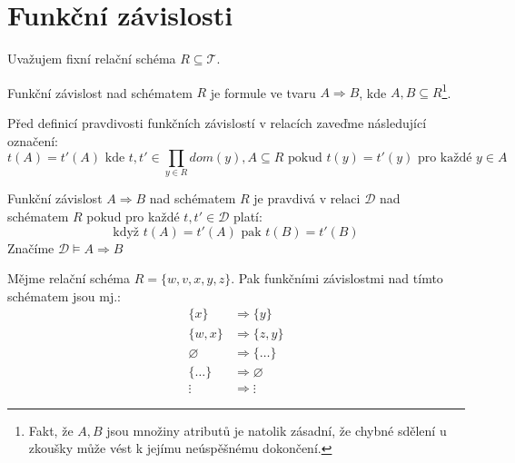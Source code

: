 \section{Funkční závislosti}
Uvažujem fixní relační schéma $R \subseteq \mathcal{T}$.
\begin{uptheorem}
Funkční závislost nad schématem $R$ je formule ve tvaru $A \Rightarrow B$, kde $A, B \subseteq R$\footnote{Fakt, že $A, B$ jsou množiny atributů je natolik zásadní, že chybné sdělení u zkoušky může vést k jejímu neúspěšnému dokončení.}.
\end{uptheorem}
Před definicí pravdivosti funkčních závislostí v relacích zaveďme následující označení:
$$
t(A)=t'(A) \text{ kde } t, t' \in \prod_{y \in R} dom(y), A \subseteq R
\text{ pokud }
 t(y)=t'(y) \text{ pro každé } y \in A
$$
\begin{uptheorem}
Funkční závislost $A \Rightarrow B$ nad schématem $R$ je pravdivá v relaci $\mathcal{D}$ nad schématem $R$ pokud pro každé $t,t' \in \mathcal{D}$ platí:
$$
\text{když } t(A)=t'(A) \text{ pak }t(B)=t'(B)
$$
Značíme $\mathcal{D} \vDash A \Rightarrow B$
\end{uptheorem}


\begin{upexample}
Mějme relační schéma $R = \{ w, v, x, y, z \}$. Pak funkčními závislostmi nad tímto schématem jsou mj.:
\begin{align*}
\{ x \} &\Rightarrow \{ y \} \\
\{ w, x \} &\Rightarrow \{ z, y \} \\
\varnothing &\Rightarrow \{ \ldots \} \\
\{ \ldots \} &\Rightarrow \varnothing \\
\vdots &\Rightarrow \vdots
\end{align*}
\end{upexample}

